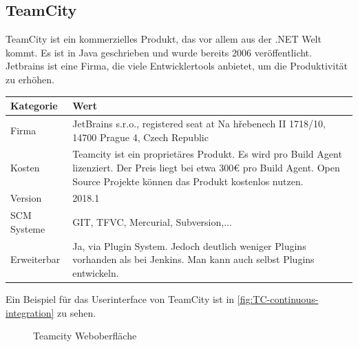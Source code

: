 \subsection{TeamCity}
TeamCity ist ein kommerzielles Produkt, das vor allem aus der .NET Welt kommt. Es ist in Java geschrieben und wurde bereits 2006 veröffentlicht. Jetbrains ist eine Firma, die viele Entwicklertools anbietet, um die Produktivität zu erhöhen. 
\begin{center}
  \begin{tabularx}{\textwidth}{lX}
    \toprule
    Kategorie & Wert \\
    \midrule
    Firma &  JetBrains s.r.o., registered seat at Na hřebenech II 1718/10, 14700 Prague 4, Czech Republic \\
		\addlinespace
    Kosten & Teamcity ist ein proprietäres Produkt. Es wird pro Build Agent lizenziert. Der Preis liegt bei etwa 300€ pro Build Agent. Open Source Projekte können das Produkt kostenlos nutzen.\\
		\addlinespace
		Version & 2018.1 \\
		\addlinespace
		SCM Systeme & GIT, TFVC, Mercurial, Subversion,...\\
		\addlinespace
		Erweiterbar & Ja, via Plugin System. Jedoch deutlich weniger Plugins vorhanden als bei Jenkins. Man kann auch selbst Plugins entwickeln.\\
    \bottomrule
  \end{tabularx}
\end{center}
Ein Beispiel für das Userinterface von TeamCity ist in \autoref{fig:TC-continuous-integration} zu sehen. 

\begin{figure}[H]
  \centering
  \caption{Teamcity Weboberfläche \cite{TeamCity-Marketing}}\label{fig:TC-continuous-integration}
\end{figure}


